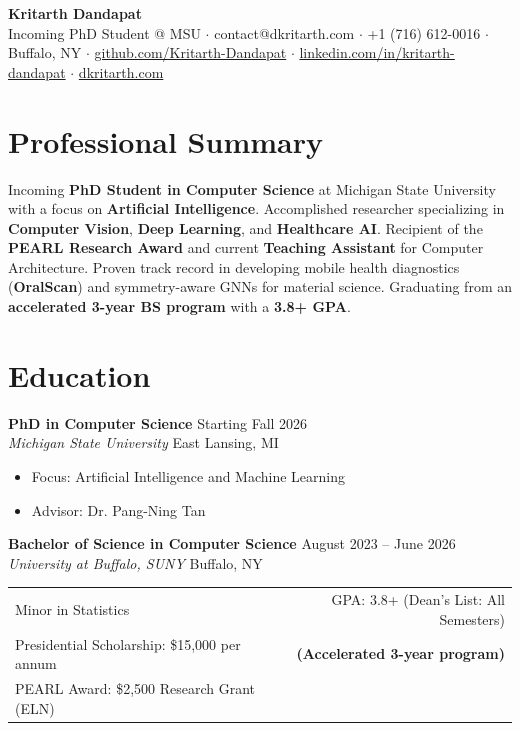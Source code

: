 \documentclass[11pt,a4paper]{article}
\begin{document}
\begin{center}
    {\LARGE\bfseries\color{dark} Kritarth Dandapat} \\
    {\small Incoming PhD Student @ MSU $\cdot$ contact@dkritarth.com $\cdot$ +1 (716) 612-0016 $\cdot$ Buffalo, NY $\cdot$ \href{https://github.com/Kritarth-Dandapat}{github.com/Kritarth-Dandapat} $\cdot$ \href{https://www.linkedin.com/in/kritarth-dandapat/}{linkedin.com/in/kritarth-dandapat} $\cdot$ \href{https://dkritarth.com/}{dkritarth.com}}
\end{center}
\vspace{0.2em}

\section*{Professional Summary}
\noindent
Incoming \textbf{PhD Student in Computer Science} at Michigan State University with a focus on \textbf{Artificial Intelligence}. Accomplished researcher specializing in \textbf{Computer Vision}, \textbf{Deep Learning}, and \textbf{Healthcare AI}. Recipient of the \textbf{PEARL Research Award} and current \textbf{Teaching Assistant} for Computer Architecture. Proven track record in developing mobile health diagnostics (\textbf{OralScan}) and symmetry-aware GNNs for material science. Graduating from an \textbf{accelerated 3-year BS program} with a \textbf{3.8+ GPA}.


\section*{Education}
\noindent
\textbf{PhD in Computer Science} \hfill Starting Fall 2026 \\
\textit{Michigan State University} \hfill East Lansing, MI
\begin{itemize}[nosep]
    \item Focus: Artificial Intelligence and Machine Learning
    \item Advisor: Dr. Pang-Ning Tan
\end{itemize}

\vspace{0.6em}

\noindent
\textbf{Bachelor of Science in Computer Science} \hfill August 2023 -- June 2026 \\
\textit{University at Buffalo, SUNY} \hfill Buffalo, NY

\vspace{0.2em}
\noindent
\begin{tabular*}{\textwidth}{@{\extracolsep{\fill}} lr}
    Minor in Statistics & GPA: 3.8+ (Dean's List: All Semesters) \\
    Presidential Scholarship: \$15,000 per annum & \textbf{(Accelerated 3-year program)} \\
    PEARL Award: \$2,500 Research Grant (ELN) & \\
\end{tabular*}
\end{document}
